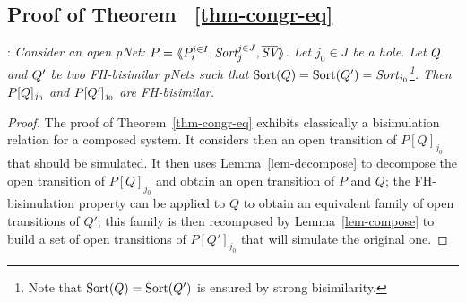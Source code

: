 \documentclass{lmcs}
\begin{document}
 \subsection{Proof of Theorem ~\ref{thm-congr-eq}}
:
\textit{	Consider an open pNet:
	$\pNet = \mylangle \pNet_i^{i\in I}, \Sort_j^{j\in J}, 
	\set{\symb{SV}}\myrangle$.
	Let $j_0\in J$ be a hole. Let $Q$ and $Q'$ be two FH-bisimilar pNets such that 
	$\Sortop(\pNetQ)=\Sortop(\pNetQ')=\Sort_{j_0}$\footnote{Note that $\operatorname{Sort}(Q)=\operatorname{Sort}(Q')$ is 
	ensured by 
	strong bisimilarity.}. Then 
	$P[Q]_{j_0}$ and 
	$P[Q']_{j_0}$ are FH-bisimilar.
}
\medskip
\begin{proof}
 The proof of Theorem~\ref{thm-congr-eq} exhibits classically a bisimulation relation for 
 a 
 composed system.  It considers then an open transition of $P[Q]_{j_0}$ that should be 
 simulated. It then uses  Lemma~\ref{lem-decompose} to decompose the open transition 
 of $P[Q]_{j_0}$ and obtain an open transition of $P$ and $Q$; the FH-bisimulation 
 property can 
 be applied  to $Q$ to obtain an equivalent family of open transitions of $Q'$; this 
 family is 
 then recomposed by Lemma~\ref{lem-compose} to build a set of open transitions of 
 $P[Q']_{j_0}$ 
 that will simulate the original one.
 


\end{proof}
\end{document}
